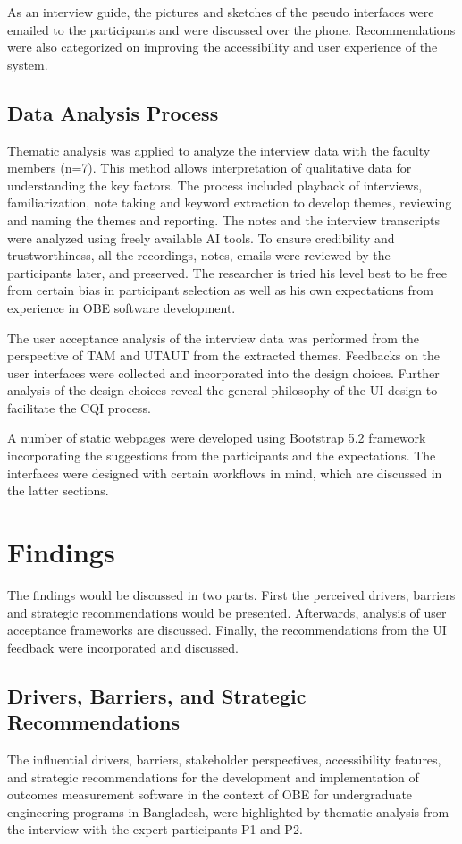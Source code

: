 \documentclass[journal,onecolumn]{IEEEtran}
\begin{document}
As an interview guide, the pictures and sketches of the pseudo interfaces were emailed to the participants and were discussed over the phone. Recommendations were also categorized on improving the accessibility and user experience of the system.



\subsection{Data Analysis Process}
Thematic analysis was applied to analyze the interview data with the faculty members (n=7). This method allows interpretation of qualitative data for understanding the key factors. The process included playback of interviews, familiarization, note taking and keyword extraction to develop themes, reviewing and naming the themes and reporting. The notes and the interview transcripts were analyzed using freely available AI tools. To ensure credibility and trustworthiness, all the recordings, notes, emails were reviewed by the participants later, and preserved. The researcher is tried his level best to be free from certain bias in participant selection as well as his own expectations from experience in OBE software development. 

The user acceptance analysis of the interview data was performed from the perspective of TAM and UTAUT from the extracted themes. Feedbacks on the user interfaces were collected and incorporated into the design choices. Further analysis of the design choices reveal the general philosophy of the UI design to facilitate the CQI process. 

A number of static webpages were developed using Bootstrap 5.2 framework incorporating the suggestions from the participants and the expectations. The interfaces were designed with certain workflows in mind, which are discussed in the latter sections. 

\section{\textbf{Findings}}
The findings would be discussed in two parts. First the perceived drivers, barriers and strategic recommendations would be presented. Afterwards, analysis of user acceptance frameworks are discussed. Finally, the recommendations from the UI feedback were incorporated and discussed. 



\subsection{\textbf{Drivers, Barriers, and Strategic Recommendations}}
The influential drivers, barriers, stakeholder perspectives, accessibility features, and strategic recommendations for the development and implementation of outcomes measurement software in the context of OBE for undergraduate engineering programs in Bangladesh, were highlighted by thematic analysis from the interview with the expert participants P1 and P2. 
\end{document}
